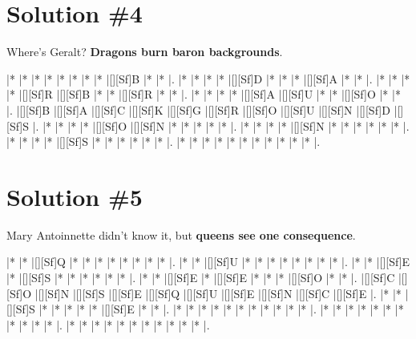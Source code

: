 \documentclass[letterpaper]{article}
\begin{document}
\newpage

\section*{Solution \#4}
Where's Geralt? \textbf{Dragons burn baron backgrounds}.

\vspace*{0.5cm}
\begin{Puzzle}{11}{9}
|*        |*        |*        |*        |*        |*        |*        |*        |[][Sf]B  |*        |*        |. 
|*        |*        |*        |*        |[][Sf]D  |*        |*        |*        |[][Sf]A  |*        |*        |.  
|*        |*        |*        |*        |[][Sf]R  |[][Sf]B  |*        |*        |[][Sf]R  |*        |*        |.
|*        |*        |*        |*        |[][Sf]A  |[][Sf]U  |*        |*        |[][Sf]O  |*        |*        |.  
|[][Sf]B  |[][Sf]A  |[][Sf]C  |[][Sf]K  |[][Sf]G  |[][Sf]R  |[][Sf]O  |[][Sf]U  |[][Sf]N  |[][Sf]D  |[][Sf]S  |.
|*        |*        |*        |*        |[][Sf]O  |[][Sf]N  |*        |*        |*        |*        |*        |. 
|*        |*        |*        |*        |[][Sf]N  |*        |*        |*        |*        |*        |*        |.
|*        |*        |*        |*        |[][Sf]S  |*        |*        |*        |*        |*        |*        |.
|*        |*        |*        |*        |*        |*        |*        |*        |*        |*        |*        |.
\end{Puzzle}

\newpage
\section*{Solution \#5}
Mary Antoinnette didn't know it, but \textbf{queens see one consequence}.

\vspace*{0.5cm}
\begin{Puzzle}{11}{9}
|*        |*        |[][Sf]Q  |*        |*        |*        |*        |*        |*        |*        |*        |. 
|*        |*        |[][Sf]U  |*        |*        |*        |*        |*        |*        |*        |*        |.  
|*        |*        |[][Sf]E  |*        |[][Sf]S  |*        |*        |*        |*        |*        |*        |.
|*        |*        |[][Sf]E  |*        |[][Sf]E  |*        |*        |*        |[][Sf]O  |*        |*        |.  
|[][Sf]C  |[][Sf]O  |[][Sf]N  |[][Sf]S  |[][Sf]E  |[][Sf]Q  |[][Sf]U  |[][Sf]E  |[][Sf]N  |[][Sf]C  |[][Sf]E  |.
|*        |*        |[][Sf]S  |*        |*        |*        |*        |*        |[][Sf]E  |*        |*        |. 
|*        |*        |*        |*        |*        |*        |*        |*        |*        |*        |*        |.
|*        |*        |*        |*        |*        |*        |*        |*        |*        |*        |*        |.
|*        |*        |*        |*        |*        |*        |*        |*        |*        |*        |*        |.
\end{Puzzle}
\end{document}
